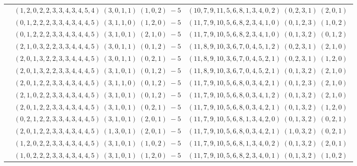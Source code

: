 \documentclass[11pt]{article}
\begin{document}
\begin{longtable}[l]{|c|c|c|}
 \cline{2-3} 
 & $(1 ,2 ,0 ,2 ,2 ,3 ,3 ,4 ,3 ,4 ,5 ,4) \;(3 ,0 ,1 ,1) \;(1 ,0 ,2) \;-5$ & $(10 ,7 ,9 ,11 ,5 ,6 ,8 ,1 ,3 ,4 ,0 ,2) \;(0 ,2 ,3 ,1) \;(2 ,0 ,1) \;$\\ 
 \cline{2-3} 
 & $(0 ,1 ,2 ,2 ,2 ,3 ,3 ,4 ,3 ,4 ,4 ,5) \;(3 ,1 ,1 ,0) \;(1 ,2 ,0) \;-5$ & $(11 ,7 ,9 ,10 ,5 ,6 ,8 ,2 ,3 ,4 ,1 ,0) \;(0 ,1 ,2 ,3) \;(1 ,0 ,2) \;$\\ 
 \cline{2-3} 
 & $(0 ,1 ,2 ,2 ,2 ,3 ,3 ,4 ,3 ,4 ,4 ,5) \;(3 ,1 ,0 ,1) \;(2 ,1 ,0) \;-5$ & $(11 ,7 ,9 ,10 ,5 ,6 ,8 ,2 ,3 ,4 ,1 ,0) \;(0 ,1 ,3 ,2) \;(0 ,1 ,2) \;$\\ 
 \cline{2-3} 
 & $(2 ,1 ,0 ,3 ,2 ,2 ,3 ,3 ,4 ,4 ,4 ,5) \;(3 ,0 ,1 ,1) \;(0 ,1 ,2) \;-5$ & $(11 ,8 ,9 ,10 ,3 ,6 ,7 ,0 ,4 ,5 ,1 ,2) \;(0 ,2 ,3 ,1) \;(2 ,1 ,0) \;$\\ 
 \cline{2-3} 
 & $(2 ,0 ,1 ,3 ,2 ,2 ,3 ,3 ,4 ,4 ,4 ,5) \;(3 ,0 ,1 ,1) \;(0 ,2 ,1) \;-5$ & $(11 ,8 ,9 ,10 ,3 ,6 ,7 ,0 ,4 ,5 ,2 ,1) \;(0 ,2 ,3 ,1) \;(1 ,2 ,0) \;$\\ 
 \cline{2-3} 
 & $(2 ,0 ,1 ,3 ,2 ,2 ,3 ,3 ,4 ,4 ,4 ,5) \;(3 ,1 ,0 ,1) \;(0 ,1 ,2) \;-5$ & $(11 ,8 ,9 ,10 ,3 ,6 ,7 ,0 ,4 ,5 ,2 ,1) \;(0 ,1 ,3 ,2) \;(2 ,1 ,0) \;$\\ 
 \cline{2-3} 
 & $(2 ,0 ,1 ,2 ,2 ,3 ,3 ,4 ,3 ,4 ,4 ,5) \;(3 ,1 ,1 ,0) \;(0 ,1 ,2) \;-5$ & $(11 ,7 ,9 ,10 ,5 ,6 ,8 ,0 ,3 ,4 ,2 ,1) \;(0 ,1 ,2 ,3) \;(2 ,1 ,0) \;$\\ 
 \cline{2-3} 
 & $(2 ,1 ,0 ,2 ,2 ,3 ,3 ,4 ,3 ,4 ,4 ,5) \;(3 ,1 ,0 ,1) \;(0 ,1 ,2) \;-5$ & $(11 ,7 ,9 ,10 ,5 ,6 ,8 ,0 ,3 ,4 ,1 ,2) \;(0 ,1 ,3 ,2) \;(2 ,1 ,0) \;$\\ 
 \cline{2-3} 
 & $(2 ,0 ,1 ,2 ,2 ,3 ,3 ,4 ,3 ,4 ,4 ,5) \;(3 ,1 ,0 ,1) \;(0 ,2 ,1) \;-5$ & $(11 ,7 ,9 ,10 ,5 ,6 ,8 ,0 ,3 ,4 ,2 ,1) \;(0 ,1 ,3 ,2) \;(1 ,2 ,0) \;$\\ 
 \cline{2-3} 
 & $(0 ,2 ,1 ,2 ,2 ,3 ,3 ,4 ,3 ,4 ,4 ,5) \;(3 ,1 ,0 ,1) \;(2 ,0 ,1) \;-5$ & $(11 ,7 ,9 ,10 ,5 ,6 ,8 ,1 ,3 ,4 ,2 ,0) \;(0 ,1 ,3 ,2) \;(0 ,2 ,1) \;$\\ 
 \cline{2-3} 
 & $(2 ,0 ,1 ,2 ,2 ,3 ,3 ,4 ,3 ,4 ,4 ,5) \;(1 ,3 ,0 ,1) \;(2 ,0 ,1) \;-5$ & $(11 ,7 ,9 ,10 ,5 ,6 ,8 ,0 ,3 ,4 ,2 ,1) \;(1 ,0 ,3 ,2) \;(0 ,2 ,1) \;$\\ 
 \cline{2-3} 
 & $(1 ,2 ,0 ,2 ,2 ,3 ,3 ,4 ,3 ,4 ,4 ,5) \;(3 ,1 ,0 ,1) \;(1 ,0 ,2) \;-5$ & $(11 ,7 ,9 ,10 ,5 ,6 ,8 ,1 ,3 ,4 ,0 ,2) \;(0 ,1 ,3 ,2) \;(2 ,0 ,1) \;$\\ 
 \cline{2-3} 
 & $(1 ,0 ,2 ,2 ,2 ,3 ,3 ,4 ,3 ,4 ,4 ,5) \;(3 ,1 ,0 ,1) \;(1 ,2 ,0) \;-5$ & $(11 ,7 ,9 ,10 ,5 ,6 ,8 ,2 ,3 ,4 ,0 ,1) \;(0 ,1 ,3 ,2) \;(1 ,0 ,2) \;$\\ 

\end{longtable}
\end{document}
